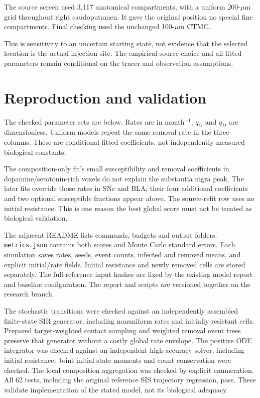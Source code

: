 \documentclass[10pt]{article}
\begin{document}
The source screen used 3,117 anatomical compartments, with a uniform 200-$\mu$m grid throughout right caudoputamen. It gave the original position no special fine compartments. Final checking used the unchanged 100-$\mu$m CTMC.


This is sensitivity to an uncertain starting state, not evidence that the selected location is the actual injection site. The empirical source choice and all fitted parameters remain conditional on the tracer and observation assumptions.

\newpage
\section*{Reproduction and validation}
The checked parameter sets are below. Rates are in month$^{-1}$; $q_G$ and $q_D$ are dimensionless. Uniform models repeat the same removal rate in the three columns. These are conditional fitted coefficients, not independently measured biological constants.
\begin{center}\scriptsize\end{center}
The composition-only fit's small susceptibility and removal coefficients in dopamine/serotonin-rich voxels do not explain the substantia nigra peak. The later fits override those rates in SNc and BLA; their four additional coefficients and two optional susceptible fractions appear above. The source-refit row uses no initial resistance. This is one reason the best global score must not be treated as biological validation.

The adjacent README lists commands, budgets and output folders. \texttt{metrics.json} contains both scores and Monte Carlo standard errors. Each simulation saves rates, seeds, event counts, infected and removed means, and explicit initial/rate fields. Initial resistance and newly removed cells are stored separately. The full-reference input hashes are fixed by the existing model report and baseline configuration. The report and scripts are versioned together on the research branch.

The stochastic transitions were checked against an independently assembled finite-state SIR generator, including nonuniform rates and initially resistant cells. Prepared target-weighted contact sampling and weighted removal event trees preserve that generator without a costly global rate envelope. The positive ODE integrator was checked against an independent high-accuracy solver, including initial resistance. Joint initial-state moments and count conservation were checked. The local composition aggregation was checked by explicit enumeration. All 62 tests, including the original reference SIS trajectory regression, pass. These validate implementation of the stated model, not its biological adequacy.
\end{document}
